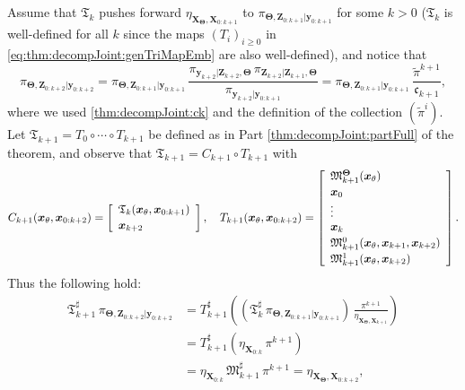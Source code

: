 \documentclass[twoside,11pt]{article}
\newcommand{\Xb}{\boldsymbol{X}}
\newcommand{\xb}{\boldsymbol{x}}
\newcommand{\yb}{\boldsymbol{y}}
\newcommand{\Zb}{\boldsymbol{Z}}
\newcommand{\vhyp}{\boldsymbol{\Theta}}
\newcommand{\vhyps}{\theta}
\newcommand{\submap}{\mathfrak{M}}
\newcommand{\pull}{^\sharp}
\begin{document}
Assume that $\mathfrak{T}_k$ pushes forward $\eta_{\Xb_{\vhyp},\Xb_{0:k+1}}$ to 
$\pi_{\vhyp,\Zb_{0:k+1}\vert \yb_{0:k+1}}$ for
some $k>0$ ($\mathfrak{T}_k$ is well-defined for all
$k$ since the maps $(T_i)_{i \ge 0}$ in 
\eqref{eq:thm:decompJoint:genTriMapEmb}  are also well-defined),
and notice that
\begin{equation}
  \pi_{{\vhyp},\Zb_{0:k+2}\vert \yb_{0:k+2}} = 
  \pi_{{\vhyp},\Zb_{0:k+1}\vert \yb_{0:k+1}} \,
  \frac{  \pi_{\yb_{k+2} \vert \Zb_{k+2} ,  {\vhyp}} \,
      \pi_{\Zb_{k+2}\vert\Zb_{k+1} , {\vhyp} } }
       {\pi_{\yb_{k+2}\vert \yb_{0:k+1}}}=
  \pi_{{\vhyp},\Zb_{0:k+1}\vert \yb_{0:k+1}} \, 
  \frac{ \widetilde{\pi}^{k+1}  }{\mathfrak{c}_{k+1}}, \nonumber
\end{equation}
%
where we used \eqref{thm:decompJoint:ck} and 
the definition of the collection $(\widetilde{\pi}^i)$.
Let $\mathfrak{T}_{k+1} = T_0 \circ \cdots \circ T_{k+1}$ be defined
as in Part \ref{thm:decompJoint:partFull} of the theorem, and observe that
$\mathfrak{T}_{k+1} =
C_{k+1} \circ T_{k+1}$ with
%
\begin{equation}  
C_{k+1}(\xb_{\vhyps}, \xb_{0:k+2} ) = 
  \left[\begin{array}{l}
    \mathfrak{T}_k(\xb_{\vhyps},\xb_{0:k+1})\\[\spacinglines] 
    \xb_{k+2}\\
     \end{array}\right], \quad
    T_{k+1}(\xb_{\vhyps},\xb_{0:k+2} ) = \left[\begin{array}{l}
    \submap_{k+1}^{\vhyp}( \xb_{\vhyps}) \\[\spacinglines]
    \xb_0 \\ 
    \vdots \\
    \xb_{k} \\[\spacinglines]
    \submap_{k+1}^0( \xb_{\vhyps}, \xb_{k+1} , \xb_{k+2}) \\[\spacinglines]
    \submap_{k+1}^1( \xb_{\vhyps}, \xb_{k+2}) \\
    \end{array}\right]. \nonumber
\end{equation}
Thus the following hold:
\begin{align} %
 \mathfrak{T}_{k+1}\pull\,\pi_{\vhyp,\Zb_{0:k+2}\vert \yb_{0:k+2}}  
 &=  
 T_{k+1}\pull \left( \left( \mathfrak{T}_{k}\pull\,\pi_{\vhyp,\Zb_{0:k+1}\vert \yb_{0:k+1}} \right) \,
 \frac{\pi^{k+1}}{\eta_{\Xb_{\vhyp},\Xb_{k+1}}}  \right) \\
 &=  
 T_{k+1}\pull \left( \eta_{\Xb_{0:k}} \, \pi^{k+1} \right) \nonumber \\
 &= 
 \eta_{\Xb_{0:k}} \,  \submap_{k+1}\pull \,\pi^{k+1}  =  
 \eta_{\Xb_{\vhyp},\Xb_{0:k+2}} , \nonumber
\end{align}
\end{document}
